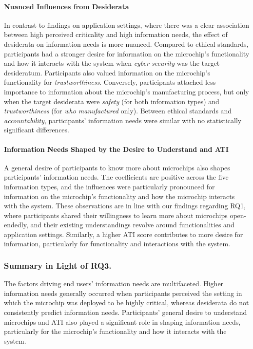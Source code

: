 \paragraph{Nuanced Influences from Desiderata}
In contrast to findings on application settings, where there was a clear association between high perceived criticality and high information needs, the effect of desiderata on information needs is more nuanced.
Compared to ethical standards, participants had a stronger desire for information on the microchip's functionality and how it interacts with the system when \textit{cyber security} was the target desideratum. 
Participants also valued information on the microchip's functionality for \textit{trustworthiness}. 
Conversely, participants attached less importance to information about the microchip's manufacturing process, but only when the target desiderata were \textit{safety} (for both information types) and \textit{trustworthiness} (for \textit{who manufactured} only).
Between ethical standards and \textit{accountability}, participants' information needs were similar with no statistically significant differences.

\paragraph{Information Needs Shaped by the Desire to Understand and \acs{ATI}}
A general desire of participants to know more about microchips also shapes participants' information needs. 
The coefficients are positive across the five information types, and the influences were particularly pronounced for information on the microchip's functionality and how the microchip interacts with the system.
These observations are in line with our findings regarding RQ1, where participants shared their willingness to learn more about microchips open-endedly, and their existing understandings revolve around functionalities and application settings.
Similarly, a higher \ac{ATI} score contributes to more desire for information, particularly for functionality and interactions with the system. 

\begin{tcolorbox}
\subsubsection*{Summary in Light of RQ3.}
The factors driving end users' information needs are multifaceted. 
Higher information needs generally occurred when participants perceived the setting in which the microchip was deployed to be highly critical, whereas desiderata do not consistently predict information needs. 
Participants' general desire to understand microchips and \ac{ATI} also played a significant role in shaping information needs, particularly for the microchip's functionality and how it interacts with the system.
\end{tcolorbox}